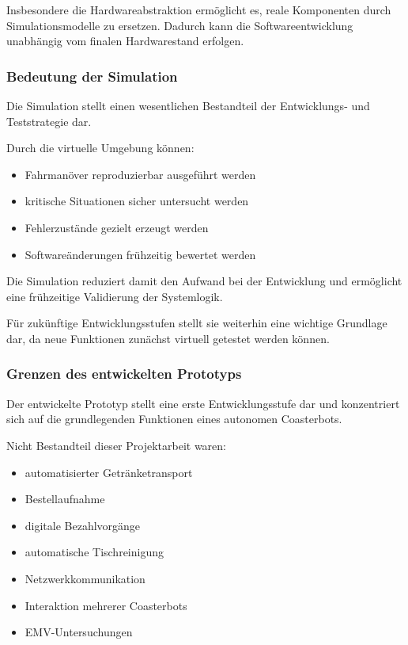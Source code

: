 \documentclass[
  a4paper,
  12pt,
  DIV=12,        %
  parskip=half,  %
  headings=small %
]{scrartcl}
\theoremstyle{definition}
\providecommand{\tightlist}{%
  \setlength{\itemsep}{0pt}\setlength{\parskip}{0pt}}
\theoremstyle{definition}
\begin{document}
Insbesondere die Hardwareabstraktion ermöglicht es, reale Komponenten
durch Simulationsmodelle zu ersetzen. Dadurch kann die
Softwareentwicklung unabhängig vom finalen Hardwarestand erfolgen.

\subsubsection{Bedeutung der Simulation}\label{bedeutung-der-simulation}

Die Simulation stellt einen wesentlichen Bestandteil der Entwicklungs-
und Teststrategie dar.

Durch die virtuelle Umgebung können:

\begin{itemize}
\tightlist
\item
  Fahrmanöver reproduzierbar ausgeführt werden
\item
  kritische Situationen sicher untersucht werden
\item
  Fehlerzustände gezielt erzeugt werden
\item
  Softwareänderungen frühzeitig bewertet werden
\end{itemize}

Die Simulation reduziert damit den Aufwand bei der Entwicklung und
ermöglicht eine frühzeitige Validierung der Systemlogik.

Für zukünftige Entwicklungsstufen stellt sie weiterhin eine wichtige
Grundlage dar, da neue Funktionen zunächst virtuell getestet werden
können.

\subsubsection{Grenzen des entwickelten
Prototyps}\label{grenzen-des-entwickelten-prototyps}

Der entwickelte Prototyp stellt eine erste Entwicklungsstufe dar und
konzentriert sich auf die grundlegenden Funktionen eines autonomen
Coasterbots.

Nicht Bestandteil dieser Projektarbeit waren:

\begin{itemize}
\tightlist
\item
  automatisierter Getränketransport
\item
  Bestellaufnahme
\item
  digitale Bezahlvorgänge
\item
  automatische Tischreinigung
\item
  Netzwerkkommunikation
\item
  Interaktion mehrerer Coasterbots
\item
  EMV-Untersuchungen
\end{itemize}
\end{document}

